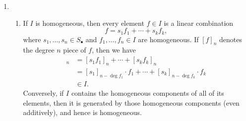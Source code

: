 \documentclass{report}
\begin{document}
\begin{enumerate}[label=\textbf{4.5.\Alph*.}]
	\item
	      \begin{enumerate}[label=(\alph*)]
		      \item If $I$ is homogeneous, then every element $f\in I$ is a linear
		            combination
		            \begin{equation*}
			            f = s_1f_1 + \cdots + s_kf_k,
		            \end{equation*}
		            where $s_1,\ldots,s_n\in S_\bullet$ and $f_1,\ldots,f_n\in I$
		            are homogeneous. If $[f]_n$ denotes the degree $n$ piece of
		            $f$, then we have
		            \begin{align*}
			            [f]_n
			             & = [s_1f_1]_n + \cdots + [s_kf_k]_n     \\
			             & = [s_1]_{n-\deg f_1}\cdot f_1 + \cdots
			            + [s_k]_{n-\deg f_k}\cdot f_k             \\
			             & \in I.
		            \end{align*}
		            Conversely, if $I$ contains the homogeneous components of all of
		            its elements, then it is generated by those homogeneous
		            components (even additively), and hence is homogeneous.


\end{enumerate}
\end{enumerate}
\end{document}
